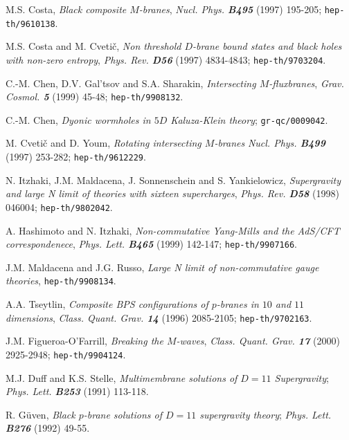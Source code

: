 \documentclass[a4paper,12pt]{article}
\begin{document}
\begin{thebibliography}{99}
    M.S. Costa,
    {\sl Black composite $M$-branes},
    {\it Nucl. Phys. \bf B495} (1997) 195-205;
    {\tt hep-th/9610138}.

    M.S. Costa and M. Cveti\v{c},
    {\sl Non threshold $D$-brane bound states and black holes with
         non-zero entropy},
    {\it Phys. Rev. \bf D56} (1997) 4834-4843;
    {\tt hep-th/9703204}.

    C.-M. Chen, D.V. Gal'tsov and S.A. Sharakin,
    {\sl Intersecting $M$-fluxbranes},
    {\it Grav. Cosmol. \bf 5} (1999) 45-48;
    {\tt hep-th/9908132}.

    C.-M. Chen,
    {\sl Dyonic wormholes in $5D$ Kaluza-Klein theory};
    {\tt gr-qc/0009042}.

    M. Cveti\v{c} and D. Youm,
    {\sl Rotating intersecting $M$-branes}
    {\it Nucl. Phys. \bf B499} (1997) 253-282;
    {\tt hep-th/9612229}.

    N. Itzhaki, J.M. Maldacena, J. Sonnenschein and S. Yankielowicz,
    {\sl Supergravity and large N limit of theories with sixteen
         supercharges},
    {\it Phys. Rev. \bf D58} (1998) 046004;
    {\tt hep-th/9802042}.

    A. Hashimoto and N. Itzhaki,
    {\sl Non-commutative Yang-Mills and the AdS/CFT correspondenece},
    {\it Phys. Lett. \bf B465} (1999) 142-147;
    {\tt hep-th/9907166}.

    J.M. Maldacena and J.G. Russo,
    {\it Large N limit of non-commutative gauge theories},
    {\tt hep-th/9908134}.

    A.A. Tseytlin,
    {\sl Composite BPS configurations of $p$-branes in $10$ and
         $11$ dimensions},
    {\it Class. Quant. Grav. \bf 14} (1996) 2085-2105;
    {\tt hep-th/9702163}.

    J.M. Figueroa-O'Farrill,
    {\sl Breaking the $M$-waves},
    {\it Class. Quant. Grav. \bf 17} (2000) 2925-2948;
    {\tt hep-th/9904124}.


    M.J. Duff and K.S. Stelle,
    {\sl Multimembrane solutions of $D=11$ Supergravity};
    {\it Phys. Lett. \bf B253} (1991) 113-118.

    R. G\"uven,
    {\sl Black $p$-brane solutions of $D=11$ supergravity theory};
    {\it Phys. Lett. \bf B276} (1992) 49-55.


\end{thebibliography}
\end{document}
